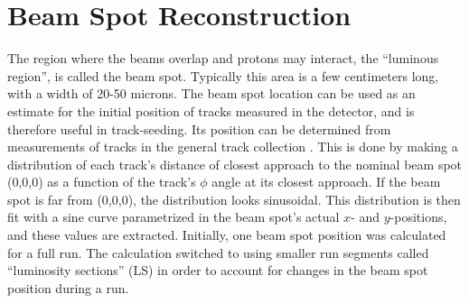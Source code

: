 


\section{Beam Spot Reconstruction}
\label{evReco:BS}
The region where the beams overlap and protons may interact, 
the ``luminous region'', is called the beam spot.  
Typically this area is a few centimeters long, 
with a width of 20-50 microns.  %
The beam spot location can be used as an estimate 
for the initial position of tracks measured in the detector, 
and is therefore useful in track-seeding.  
Its position %
can be determined from measurements of tracks in the 
general track collection 
\cite{CMS-NOTE-2007-021}.  
This is done by making a distribution of each track's distance of 
closest approach to the nominal beam spot (0,0,0) 
as a function of the track's $\phi$ angle at its 
closest approach.  
If the beam spot is far from (0,0,0), 
the distribution looks sinusoidal.  
This distribution is then fit with a sine curve 
parametrized in the beam spot's actual 
$x$- and $y$-positions, 
and these values are extracted.  
Initially, one beam spot position was calculated    %
for a full run.  
The calculation switched to using smaller run segments 
called ``luminosity sections'' (LS) 
in order to account for changes in the beam spot position 
during a run.  

